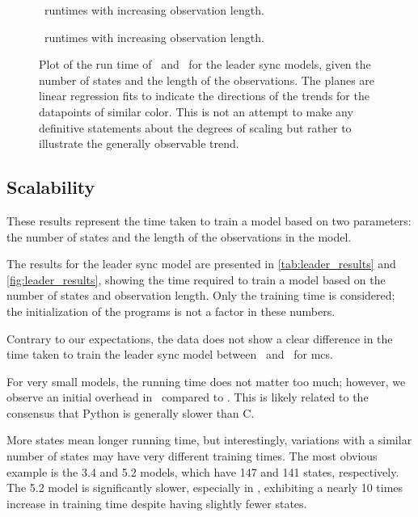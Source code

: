\begin{figure}
    
    \caption{\Cupaal\ runtimes with increasing observation length.}
    \label{fig:cupaal-length-to-runtime}
\end{figure}


\begin{figure}
    
    \caption{\Jajapy\ runtimes with increasing observation length.}
    \label{fig:jajapy-length-to-runtime}
\end{figure}


\begin{figure*}
    \centering
    
    \caption{Plot of the run time of \Jajapy\ and \Cupaal\ for the leader sync models, given the number of states and the length of the observations. The planes are linear regression fits to indicate the directions of the trends for the datapoints of similar color. This is not an attempt to make any definitive statements about the degrees of scaling but rather to illustrate the generally observable trend.}
    \label{fig:leader_results}
\end{figure*}


\subsection{Scalability}\label{subsec:scalability}
These results represent the time taken to train a model based on two parameters: the number of states and the length of the observations in the model.

The results for the leader sync model are presented in \autoref{tab:leader_results} and \autoref{fig:leader_results}, showing the time required to train a model based on the number of states and observation length. Only the training time is considered; the initialization of the programs is not a factor in these numbers.

Contrary to our expectations, the data does not show a clear difference in the time taken to train the leader sync model between \Jajapy\ and \Cupaal\ for \glspl{mc}.

For very small models, the running time does not matter too much; however, we observe an initial overhead in \Jajapy\ compared to \Cupaal. This is likely related to the consensus that Python is generally slower than C.

More states mean longer running time, but interestingly, variations with a similar number of states may have very different training times.
The most obvious example is the 3.4 and 5.2 models, which have 147 and 141 states, respectively.
The 5.2 model is significantly slower, especially in \Cupaal, exhibiting a nearly 10 times increase in training time despite having slightly fewer states.

